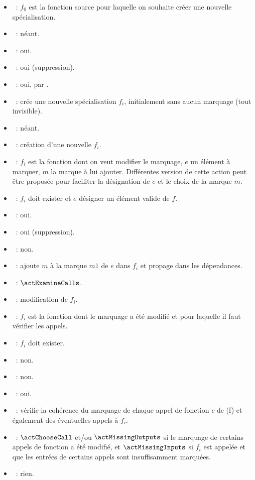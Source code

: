 
\begin{itemize}
  \item \param~: $f_0$ est la fonction source pour laquelle on souhaite créer
    une nouvelle spécialisation.
  \item \precond~: néant.
  \item \creable~: oui.
  \item \modifiable~: oui (suppression).
  \item \generable~: oui, par \actChooseCall.
  \item \application~: 
    crée une nouvelle spécialisation $f_i$, initialement sans aucun marquage
    (tout invisible).
  \item \genere~: néant.
  \item \modifie~: création d'une nouvelle $f_i$.
\end{itemize}


\begin{itemize}
  \item \param~: $f_i$ est la fonction dont on veut modifier le marquage,
    $e$ un élément à marquer, $m$ la marque à lui ajouter.
    Différentes version de cette action peut être proposée pour faciliter la
    désignation de $e$ et le choix de la marque $m$.
  \item \precond~: $f_i$ doit exister et $e$ désigner un élément valide de $f$.
  \item \creable~: oui.
  \item \modifiable~: oui (suppression).
  \item \generable~: non.
  \item \application~: ajoute $m$ à la marque $m1$ de $e$ dans $f_i$
    et propage dans les dépendances.
  \item \genere~: $\actExamineCalls$.
  \item \modifie~: modification de $f_i$.
\end{itemize}


\begin{itemize}
  \item \param~: $f_i$ est la fonction dont le marquage a été modifié
    et pour laquelle il faut vérifier les appels.
  \item \precond~: $f_i$ doit exister.
  \item \creable~: non.
  \item \modifiable~: non.
  \item \generable~: oui.
  \item \application~: 
    vérifie la cohérence du marquage de chaque appel de fonction $c$
    de \call(f) et également des éventuelles appels à $f_i$.
  \item \genere~: 
    $\actChooseCall$ et/ou $\actMissingOutputs$ si le marquage de
    certains appels de fonction a été modifié, et $\actMissingInputs$ si
    $f_i$ est appelée et que les entrées de certains appels sont insuffisamment
    marquées.
  \item \modifie~: rien.
\end{itemize}


